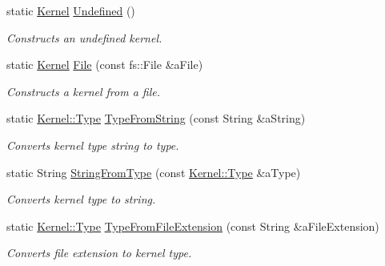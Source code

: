 \begin{DoxyCompactItemize}
\item 
static \hyperlink{classostk_1_1physics_1_1env_1_1ephem_1_1spice_1_1_kernel}{Kernel} \hyperlink{classostk_1_1physics_1_1env_1_1ephem_1_1spice_1_1_kernel_adbae01d9d825d6f3863300c19d4e9645}{Undefined} ()
\begin{DoxyCompactList}\small\item\em Constructs an undefined kernel. \end{DoxyCompactList}\item 
static \hyperlink{classostk_1_1physics_1_1env_1_1ephem_1_1spice_1_1_kernel}{Kernel} \hyperlink{classostk_1_1physics_1_1env_1_1ephem_1_1spice_1_1_kernel_ac8fd10aa02653d50fb9eb32643172531}{File} (const fs\+::\+File \&a\+File)
\begin{DoxyCompactList}\small\item\em Constructs a kernel from a file. \end{DoxyCompactList}\item 
static \hyperlink{classostk_1_1physics_1_1env_1_1ephem_1_1spice_1_1_kernel_a76d560bbface15a0cb24cd82e9a93d77}{Kernel\+::\+Type} \hyperlink{classostk_1_1physics_1_1env_1_1ephem_1_1spice_1_1_kernel_a95148b8d8a008742cb09c7c5fddde8f8}{Type\+From\+String} (const String \&a\+String)
\begin{DoxyCompactList}\small\item\em Converts kernel type string to type. \end{DoxyCompactList}\item 
static String \hyperlink{classostk_1_1physics_1_1env_1_1ephem_1_1spice_1_1_kernel_a9774d27862bbc05354e30f093c666f7c}{String\+From\+Type} (const \hyperlink{classostk_1_1physics_1_1env_1_1ephem_1_1spice_1_1_kernel_a76d560bbface15a0cb24cd82e9a93d77}{Kernel\+::\+Type} \&a\+Type)
\begin{DoxyCompactList}\small\item\em Converts kernel type to string. \end{DoxyCompactList}\item 
static \hyperlink{classostk_1_1physics_1_1env_1_1ephem_1_1spice_1_1_kernel_a76d560bbface15a0cb24cd82e9a93d77}{Kernel\+::\+Type} \hyperlink{classostk_1_1physics_1_1env_1_1ephem_1_1spice_1_1_kernel_a122e767d102358254cf73cfade4652fc}{Type\+From\+File\+Extension} (const String \&a\+File\+Extension)
\begin{DoxyCompactList}\small\item\em Converts file extension to kernel type. \end{DoxyCompactList}\end{DoxyCompactItemize}


